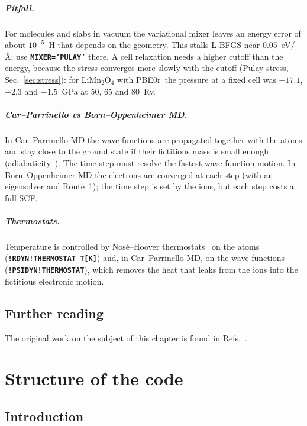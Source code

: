 \documentclass[11pt,a4paper,oneside]{book}
\newcommand{\pbezero}{PBE0r}
\newcommand{\key}[1]{\textbf{\texttt{#1}}}
\begin{document}
\paragraph{Pitfall.} For molecules and slabs in vacuum the variational
mixer leaves an energy error of about $10^{-5}$~H that depends on the
geometry. This stalls L-BFGS near 0.05~eV/\AA; use
\key{MIXER='PULAY'} there. A cell relaxation needs a higher cutoff than the
energy, because the stress converges more slowly with the cutoff
(Pulay stress, Sec.~\ref{sec:stress}): for LiMn$_2$O$_4$ with \pbezero\ the pressure
at a fixed cell was $-17.1$, $-2.3$ and $-1.5$~GPa at 50, 65 and 80~Ry.

\paragraph{Car--Parrinello vs Born--Oppenheimer MD.} In Car--Parrinello
MD the wave functions are propagated together with the atoms and stay
close to the ground state if their fictitious mass is small enough
(adiabaticity~\cite{BloechlParrinello1992}). The time step must resolve
the fastest wave-function motion. In Born--Oppenheimer MD the electrons
are converged at each step (with an eigensolver and Route~1); the time
step is set by the ions, but each step costs a full SCF.

\paragraph{Thermostats.} Temperature is controlled by Nos\'e--Hoover
thermostats~\cite{Nose1984} on the atoms (\key{!RDYN!THERMOSTAT T[K]}) and,
in Car--Parrinello MD, on the wave functions~\cite{Bloechl2002}
(\key{!PSIDYN!THERMOSTAT}), which removes the heat that leaks from the
ions into the fictitious electronic motion.


\section*{Further reading}
The original work on the subject of this chapter is found in
Refs.~\cite{NielsenMartin1985,Nose1984,BloechlParrinello1992,Bloechl2002,liu89_mp45_503}.

\chapter{Structure of the code}\label{chap:code}
\minitoc
\section{Introduction}
\end{document}
